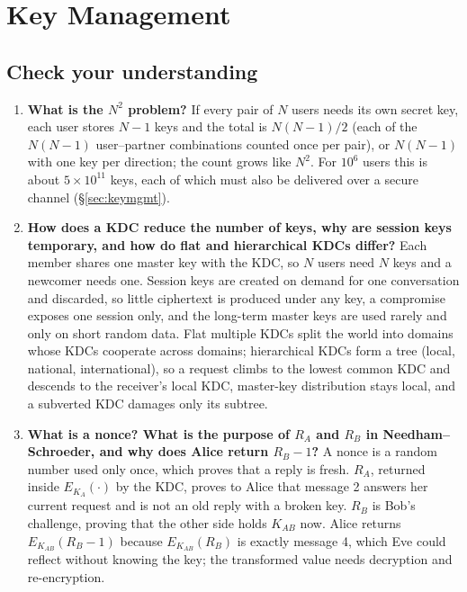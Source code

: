 \section{Key Management}\label{q:keymgmt}
\providecommand{\kmK}[1]{K_{\text{#1}}}

\subsection*{Check your understanding}
\begin{enumerate}[leftmargin=1.6em,itemsep=3pt]
  \item \textbf{What is the $N^2$ problem?} If every pair of $N$ users needs its own secret key, each user stores $N - 1$ keys and the total is $N(N-1)/2$ (each of the $N(N-1)$ user--partner combinations counted once per pair), or $N(N-1)$ with one key per direction; the count grows like $N^2$. For $10^6$ users this is about $5 \times 10^{11}$ keys, each of which must also be delivered over a secure channel (\S\ref{sec:keymgmt}).
  \item \textbf{How does a KDC reduce the number of keys, why are session keys temporary, and how do flat and hierarchical KDCs differ?} Each member shares one master key with the KDC, so $N$ users need $N$ keys and a newcomer needs one. Session keys are created on demand for one conversation and discarded, so little ciphertext is produced under any key, a compromise exposes one session only, and the long-term master keys are used rarely and only on short random data. Flat multiple KDCs split the world into domains whose KDCs cooperate across domains; hierarchical KDCs form a tree (local, national, international), so a request climbs to the lowest common KDC and descends to the receiver's local KDC, master-key distribution stays local, and a subverted KDC damages only its subtree.
  \item \textbf{What is a nonce? What is the purpose of $R_A$ and $R_B$ in Needham--Schroeder, and why does Alice return $R_B - 1$?} A nonce is a random number used only once, which proves that a reply is fresh. $R_A$, returned inside $E_{K_A}(\cdot)$ by the KDC, proves to Alice that message 2 answers her current request and is not an old reply with a broken key. $R_B$ is Bob's challenge, proving that the other side holds $K_{AB}$ now. Alice returns $E_{K_{AB}}(R_B - 1)$ because $E_{K_{AB}}(R_B)$ is exactly message 4, which Eve could reflect without knowing the key; the transformed value needs decryption and re-encryption.

\end{enumerate}

